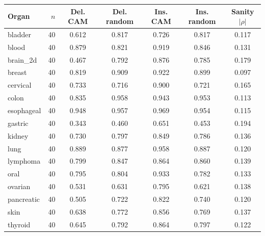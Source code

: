 \begin{tabular}{@{}lrccccc@{}}
\toprule
Organ & $n$ & Del. CAM & Del. random & Ins. CAM & Ins. random & Sanity $|\rho|$ \\
\midrule
bladder & 40 & 0.612 & 0.817 & 0.726 & 0.817 & 0.117 \\
blood & 40 & 0.879 & 0.821 & 0.919 & 0.846 & 0.131 \\
brain\_2d & 40 & 0.467 & 0.792 & 0.876 & 0.785 & 0.179 \\
breast & 40 & 0.819 & 0.909 & 0.922 & 0.899 & 0.097 \\
cervical & 40 & 0.733 & 0.716 & 0.900 & 0.721 & 0.165 \\
colon & 40 & 0.835 & 0.958 & 0.943 & 0.953 & 0.113 \\
esophageal & 40 & 0.948 & 0.957 & 0.969 & 0.954 & 0.115 \\
gastric & 40 & 0.343 & 0.460 & 0.651 & 0.453 & 0.194 \\
kidney & 40 & 0.730 & 0.797 & 0.849 & 0.786 & 0.136 \\
lung & 40 & 0.889 & 0.877 & 0.958 & 0.887 & 0.120 \\
lymphoma & 40 & 0.799 & 0.847 & 0.864 & 0.860 & 0.139 \\
oral & 40 & 0.795 & 0.804 & 0.933 & 0.782 & 0.133 \\
ovarian & 40 & 0.531 & 0.631 & 0.795 & 0.621 & 0.138 \\
pancreatic & 40 & 0.505 & 0.722 & 0.822 & 0.740 & 0.120 \\
skin & 40 & 0.638 & 0.772 & 0.856 & 0.769 & 0.137 \\
thyroid & 40 & 0.645 & 0.792 & 0.864 & 0.797 & 0.122 \\
\bottomrule
\end{tabular}